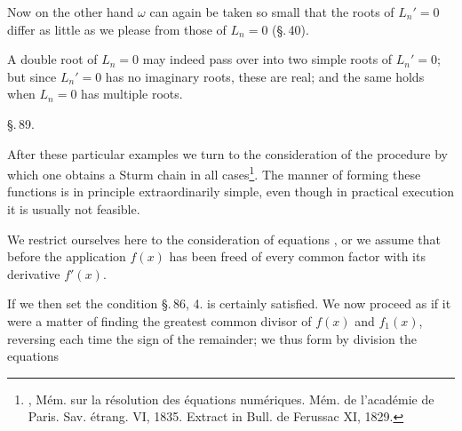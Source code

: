 Now on the other hand $\omega$ can again be taken so small that the roots of $L_n' = 0$ differ as little as we please from those of $L_n = 0$ (\S.\,40).

A double root of $L_n=0$ may indeed pass over into two simple roots of $L_n'=0$; but since $L_n'=0$ has no imaginary roots, these are real; and the same holds when $L_n=0$ has multiple roots.


\begin{center}
\S.\,89.

\end{center}

After these particular examples we turn to the consideration of the procedure by which one obtains a Sturm chain in all cases\footnote{, M\'em. sur la r\'esolution des \'equations num\'eriques. M\'em. de l'acad\'emie de Paris. Sav. \'etrang. VI, 1835. Extract in Bull. de Ferussac XI, 1829.}. The manner of forming these functions is in principle extraordinarily simple, even though in practical execution it is usually not feasible.

We restrict ourselves here to the consideration of equations , or we assume that before the application $f(x)$ has been freed of every common factor with its derivative $f'(x)$.

If we then set
the condition \S.\,86, 4. is certainly satisfied. We now proceed as if it were a matter of finding the greatest common divisor of $f(x)$ and $f_1(x)$, reversing each time the sign of the remainder; we thus form by division the equations

